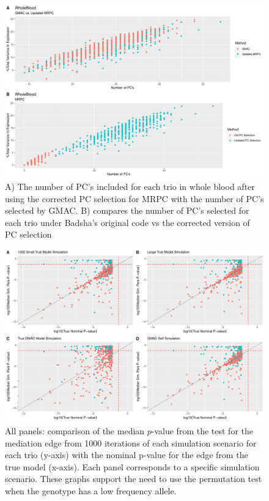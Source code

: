 \documentclass[
]{article}
\begin{document}
\begin{figure}
\centering
\includegraphics{12_15_2021_GMAC_plots_all_trios_files/figure-latex/unnamed-chunk-4-1.pdf}
\caption{A) The number of PC's included for each trio in whole blood
after using the corrected PC selection for MRPC with the number of PC's
selected by GMAC. B) compares the number of PC's selected for each trio
under Badsha's original code vs the corrected version of PC selection}
\end{figure}

\begin{figure}
\centering
\includegraphics{12_15_2021_GMAC_plots_all_trios_files/figure-latex/unnamed-chunk-5-1.pdf}
\caption{All panels: comparison of the median \(p\)-value from the test
for the mediation edge from 1000 iterations of each simulation scenario
for each trio (y-axis) with the nominal p-value for the edge from the
true model (x-axis). Each panel corresponds to a specific simulation
scenario. These graphs support the need to use the permutation test when
the genotype has a low frequency allele.}
\end{figure}
\end{document}

